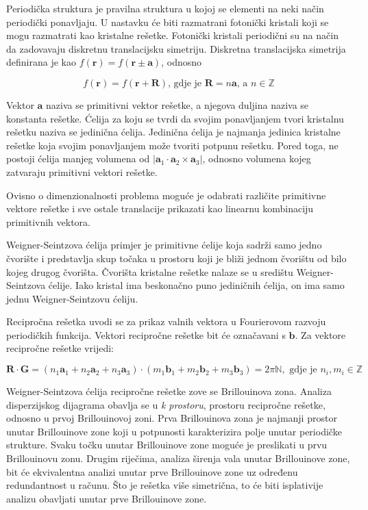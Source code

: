 \documentclass[utf8, seminar]{fer}
\begin{document}
Periodička struktura je pravilna struktura u kojoj se elementi na neki način
periodički ponavljaju. U nastavku će biti razmatrani fotonički kristali koji se
mogu razmatrati kao kristalne rešetke. Fotonički kristali periodični su na način
da zadovavaju diskretnu translacijsku simetriju.
Diskretna translacijska simetrija definirana je kao
${f(\mathbf{r}) = f(\mathbf{r} \pm \mathbf{a})}$, odnosno

\begin{equation}
	f(\mathbf{r}) = f(\mathbf{r} + \mathbf{R}) \text{, gdje je }{\mathbf{R} =
	n\mathbf{a}} \text{, a } n \in \mathbb{Z}
\end{equation}

Vektor $\mathbf{a}$ naziva se primitivni vektor rešetke, a njegova duljina
naziva se konstanta rešetke. Ćelija za koju se tvrdi da svojim ponavljanjem
tvori kristalnu rešetku naziva se jedinična ćelija. Jedinična ćelija je
najmanja jedinica kristalne rešetke koja svojim ponavljanjem može tvoriti
potpunu rešetku. Pored toga, ne postoji ćelija manjeg volumena od
${|\mathbf{a}_1 \cdot \mathbf{a}_2 \times \mathbf{a}_3|}$, odnosno volumena
kojeg zatvaraju primitivni vektori rešetke.


Ovisno o dimenzionalnosti problema moguće je odabrati različite primitivne
vektore rešetke i sve ostale translacije prikazati kao linearnu kombinaciju
primitivnih vektora.

Weigner-Seintzova ćelija primjer je primitivne ćelije koja sadrži samo jedno
čvorište i predstavlja skup točaka u prostoru koji je bliži jednom čvorištu
od bilo kojeg drugog čvorišta. Čvorišta kristalne rešetke nalaze se u središtu
Weigner-Seintzova ćelije. Iako kristal ima beskonačno puno jediničnih ćelija,
on ima samo jednu Weigner-Seintzovu ćeliju.

Recipročna rešetka uvodi se za prikaz valnih vektora u Fourierovom razvoju
periodičkih funkcija. Vektori recipročne rešetke bit će označavani s $\mathbf{b}$.
Za vektore recipročne rešetke vrijedi:

\begin{equation}
	\mathbf{R} \cdot \mathbf{G} =
	(n_1\mathbf{a}_1 + n_2\mathbf{a}_2 + n_3\mathbf{a}_3)
	\cdot
	(m_1\mathbf{b}_1 + m_2\mathbf{b}_2 + m_3\mathbf{b}_3) = 2 \pi \mathbb{N},
		\text{ gdje je }n_i, m_i \in \mathbb{Z}
\end{equation}


Weigner-Seintzova ćelija recipročne rešetke zove se Brillouinova zona. Analiza
disperzijskog dijagrama obavlja se u \textit{k prostoru}, prostoru recipročne
rešetke, odnosno u prvoj Brillouinovoj zoni. Prva Brillouinova zona je najmanji
prostor unutar Brillouinove zone koji u potpunosti karakterizira polje unutar
periodičke strukture. Svaku točku unutar Brillouinove zone moguće je preslikati
u prvu Brillouinovu zonu. Drugim riječima, analiza širenja vala unutar
Brillouinove zone, bit će ekvivalentna analizi unutar prve Brillouinove zone uz
određenu redundantnost u računu. Što je rešetka više simetrična, to će biti
isplativije analizu obavljati unutar prve Brillouinove zone.
\end{document}
